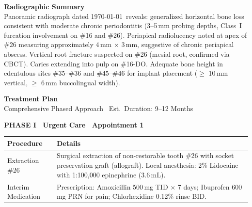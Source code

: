 \documentclass[11pt,a4paper]{article}
\newcommand{\statuslegend}[2]{%
  \tikz[baseline=-0.5ex]{\node[circle, fill=#1, minimum size=3mm, inner sep=0pt]{};} \ #2%
}
\begin{document}
\begin{tcolorbox}[
  colback=white,
  colframe=primary!30,
  arc=3mm,
  boxrule=0.5pt,
  left=4mm,
  right=4mm,
  top=3mm,
  bottom=3mm,
]
\begin{center}
  \end{center}
\end{tcolorbox}

\vspace{3mm}

{\bfseries\color{primary}\Large Radiographic Summary}\\[2mm]
Panoramic radiograph dated \today\ reveals: generalized horizontal bone loss consistent with moderate chronic periodontitis (3--5\,mm probing depths, Class\ I furcation involvement on \#16 and \#26). Periapical radiolucency noted at apex of \#26 measuring approximately 4\,mm $\times$ 3\,mm, suggestive of chronic periapical abscess. Vertical root fracture suspected on \#26 (mesial root, confirmed via CBCT). Caries extending into pulp on \#16-DO. Adequate bone height in edentulous sites \#35--\#36 and \#45--\#46 for implant placement ($\geq$ 10\,mm vertical, $\geq$ 6\,mm buccolingual width).

\newpage

{\bfseries\color{primary}\Huge Treatment Plan}\\[4mm]
{\large\color{darktext}Comprehensive Phased Approach \textbar\ Est.\ Duration: 9--12 Months}\\[2mm]

\vspace{3mm}

\begin{phasebox}[colback=primary!6, colframe=primary!40]
  {\bfseries\color{primary}PHASE I \textbar\ Urgent Care \textbar\ Appointment 1}\\[2mm]
  \begin{tabular}{@{}L{7cm} L{7cm}@{}}
    \textbf{Procedure} & \textbf{Details} \\ \midrule
    Extraction \#26 & Surgical extraction of non-restorable tooth \#26 with socket preservation graft (allograft). Local anesthesia: 2\% Lidocaine with 1:100,000 epinephrine (3.6\,mL). \\
    Interim Medication & Prescription: Amoxicillin 500\,mg TID $\times$ 7 days; Ibuprofen 600\,mg PRN for pain; Chlorhexidine 0.12\% rinse BID. \\
  \end{tabular}
\end{phasebox}
\end{document}
